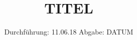 

\subject{VERSUCH NUMMER}
\title{TITEL}
\date{
  Durchführung: 11.06.18
  \hspace{3em}
  Abgabe: DATUM
}



\maketitle
\newpage






\printbibliography


